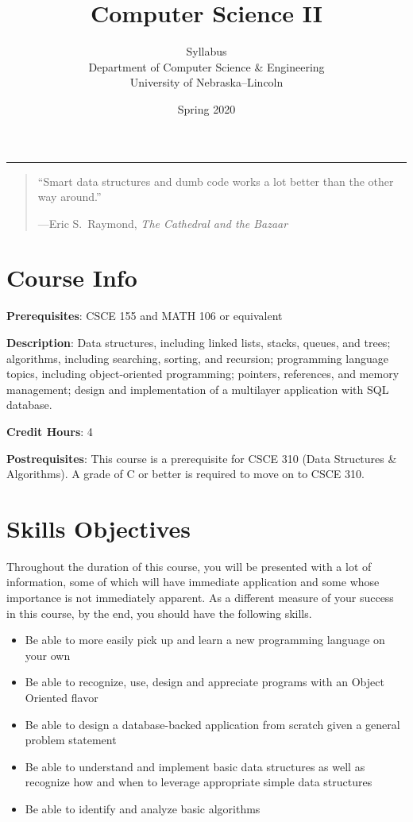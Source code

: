 \documentclass[12pt]{scrartcl}
\title{Computer Science II}\let\Title\@title
\subtitle{Syllabus\\
{\small
\vskip1cm
Department of Computer Science \& Engineering \\
University of Nebraska--Lincoln}
\vskip-1cm}
\date{Spring 2020}
\begin{document}
\maketitle


\hrule

\begin{quote}
``Smart data structures and dumb code works a lot better than the other way around.'' 

\hfill ---Eric S.\ Raymond, \emph{The Cathedral and the Bazaar}
\end{quote}

\section{Course Info}

\textbf{Prerequisites}: CSCE 155 and MATH 106 or equivalent

\textbf{Description}: Data structures, including linked lists, stacks, 
queues, and trees; algorithms, including searching, sorting, and 
recursion; programming language topics, including object-oriented 
programming; pointers, references, and memory management; design and 
implementation of a multilayer application with SQL database.

\textbf{Credit Hours}: 4

\textbf{Postrequisites}: This course is a prerequisite for CSCE 310
(Data Structures \& Algorithms).  A grade of C or better is required 
to move on to CSCE 310.

\section{Skills Objectives}

Throughout the duration of this course, you will be presented 
with a lot of information, some of which will have immediate 
application and some whose importance is not immediately apparent.  
As a different measure of your success in this course, by the end, 
you should have the following skills.

\begin{itemize}
  \item Be able to more easily pick up and learn a new programming 
  language on your own
  \item Be able to recognize, use, design and appreciate programs 
  with an Object Oriented flavor
  \item Be able to design a database-backed application from scratch 
  given a general problem statement
  \item Be able to understand and implement basic data structures 
  as well as recognize how and when to leverage appropriate simple 
  data structures
  \item Be able to identify and analyze basic algorithms
\end{itemize}
\end{document}
